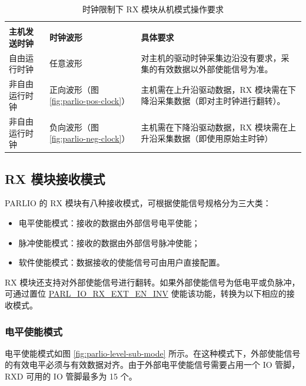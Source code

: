\documentclass[main\_\_CN.tex]{subfiles}
\begin{document}
\begin{table}[H]
    \centering
    \caption{时钟限制下 RX 模块从机模式操作要求}
    \label{tab:parlio-rx-slave-restriction}

    \begin{tabular}{|l|l|p{10cm}|}
    \hline
        \rowcolor{lightgray}
        \multicolumn{2}{|c|}{\textbf{时钟条件}} & \\
        \rowcolor{lightgray}
        \textbf{主机发送时钟} &\textbf{时钟波形} & \multirow{-2}{*}{\textbf{具体要求}} \\ \hline

        自由运行时钟    & 任意波形  & 对主机的驱动时钟采集边沿没有要求，采集的有效数据以外部使能信号为准。 \\ \hline
        非自由运行时钟  & 正向波形（图 \ref{fig:parlio-pos-clock}） & 主机需在上升沿驱动数据，RX 模块需在下降沿采集数据（即对主时钟进行翻转）。    \\ \hline
        非自由运行时钟  & 负向波形（图 \ref{fig:parlio-neg-clock}）  & 主机需在下降沿驱动数据，RX 模块需在上升沿采集数据（即使用原始主时钟）   \\ \hline
    \end{tabular}
\end{table}

\subsection{RX 模块接收模式}

PARLIO 的 RX 模块有八种接收模式，可根据使能信号规格分为三大类：

\begin{itemize}
    \item 电平使能模式：接收的数据由外部信号电平使能；
    \item 脉冲使能模式：接收的数据由外部信号脉冲使能；
    \item 软件使能模式：数据接收的使能信号可由用户直接配置。
\end{itemize}

RX 模块还支持对外部使能信号进行翻转。如果外部使能信号为低电平或负脉冲，可通过置位 \hyperref[fielddesc:PARLIORXEXTENINV]{PARL\_IO\_RX\_EXT\_EN\_INV} 使能该功能，转换为以下相应的接收模式。

\subsubsection{电平使能模式}

电平使能模式如图 \ref{fig:parlio-level-sub-mode} 所示。在这种模式下，外部使能信号的有效电平必须与有效数据对齐。由于外部电平使能信号需要占用一个 IO 管脚，RXD 可用的 IO 管脚最多为 15 个。
\end{document}
